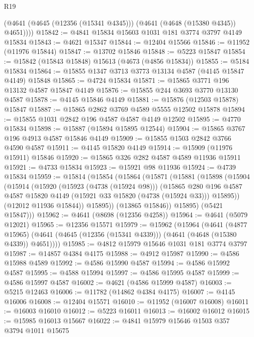 \begin{lexlean}{R19}
\begin{coremodule}
        (@4641 (@4645 (@12356 (@15341 @4345))) (@4641 (@4648 (@15380 @4345)) @4651))))
@15842 := @4841 @15834 @15603 @1031 @181 @3774 @3797 @4149 @15834
@15843 := @4621 @15347
@15844 := @12404 @15566
@15846 := @11952 (@11976 @15844)
@15847 := @13702 @15846
@15848 := @5223 @15847
@15854 := @15842 (@15843 @15848) @15613 (@4673 (@4856 @15834))
@15855 := @5184 @15834
@15864 := @15855 @1347 @3713 @3773 @13134 @4587 (@4145 @15847 @4149) @15848
@15865 := @4724 @15834
@15871 := @15865 @3771 @196 @13132 @4587 @15847 @4149
@15876 := @15855 @244 @3693 @3770 @13130 @4587
@15878 := @4145 @15846 @4149
@15881 := @15876 (@12503 @15878) @15847
@15887 := @15865 @2862 @3769 @4589 @5555 @12502 @15878
@15894 := @15855 @1031 @2842 @196 @4587 @4587 @4149 @12502
@15895 := @4770 @15834
@15898 := @15887 (@15894 @15895 @12544)
@15904 := @15865 @3767 @196 @4913 @4587 @15846 @4149
@15909 := @15855 @1503 @2842 @3766 @4590 @4587
@15911 := @4145 @15820 @4149
@15914 := @15909 (@11976 @15911) @15846
@15920 := @15865 @326 @282 @4587 @4589 @11936 @15911
@15921 := @4733 @15834
@15923 := @15921 @98 @11936
@15924 := @4739 @15834
@15959 := @15814
    (@15854
      (@15864
        (@15871
          (@15881
            (@15898
              (@15904
                (@15914
                  (@15920
                    (@15923 (@4738 (@15924 @98)))
                    (@15865
                      @280
                      @196
                      @4587
                      @4587
                      @15820
                      @4149
                      (@15921 @33 @15820 (@4738 (@15924 @33)))
                      @15895))
                  (@12012 @11936 @15844))
                @15895))
            (@13865 @15846))
          @15895)
        (@5421 @15847)))
@15962 := @4641 (@8698 (@12356 @4258))
@15964 := @4641 (@5079 @12021)
@15965 := @12356 @15571
@15979 := @15962
    (@15964
      (@4641
        (@4877 @15965)
        (@4641 (@4645 (@12356 (@15341 @4339))) (@4641 (@4648 (@15380 @4339)) @4651))))
@15985 := @4812 @15979 @15646 @1031 @181 @3774 @3797
@15987 := @14857 @4384 @4175
@15988 := @4912 @15987
@15990 := @4586 @15988 @4589
@15992 := @4586 @15990 @4587
@15994 := @4586 @15992 @4587
@15995 := @4588 @15994
@15997 := @4586 @15995 @4587
@15999 := @4586 @15997 @4587
@16002 := @4621 (@4586 @15999 @4587)
@16003 := @5215 @12463
@16006 := @11782 (@14862 @4384 @4175)
@16007 := @4145 @16006
@16008 := @12404 @15571
@16010 := @11952 (@16007 @16008)
@16011 := @16003 @16010
@16012 := @5223 @16011
@16013 := @16002 @16012
@16015 := @15985 @16013 @15667
@16022 := @4841 @15979 @15646 @1503 @357 @3794 @1011 @15675

\end{coremodule}
\end{lexlean}
